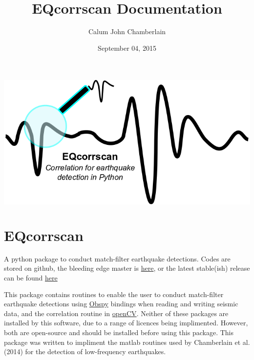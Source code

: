 \documentclass[a4paper,10pt,english]{sphinxmanual}
\title{EQcorrscan Documentation}
\date{September 04, 2015}
\author{Calum John Chamberlain}
\begin{document}
\maketitle
\tableofcontents
{}\label{index::doc}

\href{https://github.com/calum-chamberlain/EQcorrscan/releases}{\includegraphics{EQcorrscan_logo.png}}

\chapter{EQcorrscan}
\label{index:eqcorrscan}\label{index:welcome-to-eqcorrscan-s-documentation}
A python package to conduct match-filter earthquake detections.  Codes are stored
on github, the bleeding edge master is \href{https://github.com/calum-chamberlain/EQcorrscan}{here}, or the latest stable(ish) release
can be found \href{https://github.com/calum-chamberlain/EQcorrscan/releases}{here}

This package contains routines to enable the user to conduct match-filter earthquake
detections using \href{https://github.com/obspy/obspy/wiki}{Obspy} bindings when reading
and writing seismic data, and the correlation routine in \href{http://opencv.org/}{openCV}.
Neither of these packages are installed by this software, due to a range of
licences being implimented.  However, both are open-source and should be installed
before using this package.  This package was written to impliment the matlab routines
used by Chamberlain et al. (2014) for the detection of low-frequency earthquakes.
\end{document}
